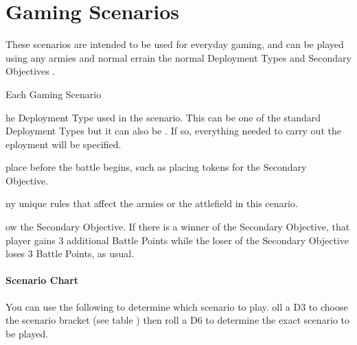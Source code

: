 \part*{Gaming Scenarios}
\label{gaming_scenarios}

These scenarios are intended to be used for everyday gaming, and can be played using any armies and normal errain the normal Deployment Types and Secondary Objectives .

Each Gaming Scenario 

\startgamingscenarioheadings%
 he Deployment Type used in the scenario. This can be one of the standard Deployment Types but it can also be . If so, everything needed to carry out the eployment will be specified.

  place before the battle begins, such as placing tokens for the Secondary Objective. 

 ny unique rules that affect the armies or the attlefield in this cenario.

 ow  the Secondary Objective. If there is a winner of the Secondary Objective, that player gains 3 additional Battle Points while the loser of the Secondary Objective loses 3 Battle Points, as usual.
\closegamingscenarioheadings%

\subsection*{Scenario Chart}

You can use the following  to  determine which scenario to play. oll a D3 to choose the scenario bracket (see  table ) then roll a D6 to determine the exact scenario to be played.

